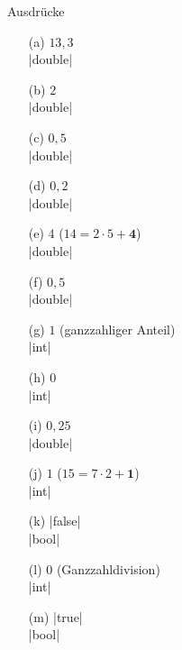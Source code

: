 \begin{exercise}{Ausdrücke}
\begin{solution}
\begin{center}
\begin{minipage}{0.3\textwidth}
\begin{itemize}
\item[(a)] $13{,}3$  \\ \code|double|
\item[(b)] $2$       \\ \code|double|
\item[(c)] $0{,}5$   \\ \code|double|
\item[(d)] $0{,}2$   \\ \code|double|
\item[(e)] $4$ ($14 = 2\cdot 5 + \boldsymbol{4}$) \\ \code|double|
\end{itemize}
\end{minipage}
\begin{minipage}{0.3\textwidth}
\begin{itemize}
\item[(f)] $0{,}5$   \\ \code|double|
\item[(g)] $1$ (ganzzahliger Anteil) \\ \code|int|
\item[(h)] $0$               \\ \code|int|
\item[(i)] $0{,}25$  \\ \code|double|
\item[(j)] $1$ ($15 = 7\cdot 2 + \boldsymbol{1}$) \\ \code|int|
\end{itemize}
\end{minipage}
\begin{minipage}{0.3\textwidth}
\begin{itemize}
\item[(k)] \code|false|          \\ \code|bool|
\item[(l)] $0$  (Ganzzahldivision) \\ \code|int|
\item[(m)] \code|true|            \\ \code|bool|
\end{itemize}
\end{minipage}
\end{center}
\end{solution}

\end{exercise}

